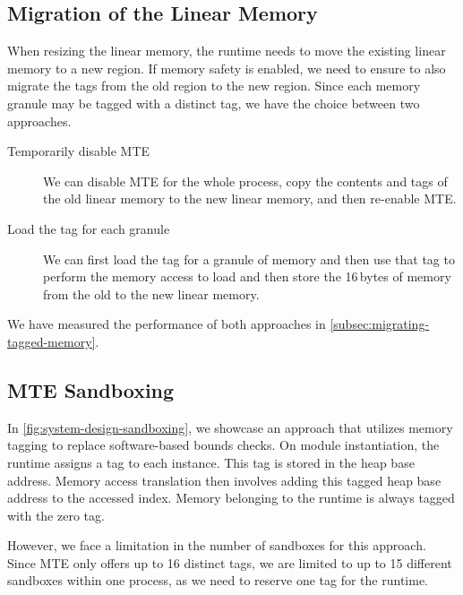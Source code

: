 \subsection{Migration of the Linear Memory}
\label{subsec:migration-of-the-linear-memory}

When resizing the linear memory, the runtime needs to move the existing linear memory to a new region.
If memory safety is enabled, we need to ensure to also migrate the tags from the old region to the new region.
Since each memory granule may be tagged with a distinct tag, we have the choice between two approaches.

\begin{description}
\item[Temporarily disable MTE]
We can disable \ac{MTE} for the whole process, copy the contents and tags of the old linear memory to the new linear memory, and then re-enable \ac{MTE}.

\item[Load the tag for each granule]
We can first load the tag for a granule of memory and then use that tag to perform the memory access to load and then store the 16\,bytes of memory from the old to the new linear memory.
\end{description}

\noindent
We have measured the performance of both approaches in \cref{subsec:migrating-tagged-memory}.

\subsection{\ac{MTE} Sandboxing}
\label{subsec:bounds-checks}

In \cref{fig:system-design-sandboxing}, we showcase an approach that utilizes memory tagging to replace software-based bounds checks.
On module instantiation, the runtime assigns a tag to each instance.
This tag is stored in the heap base address.
Memory access translation then involves adding this tagged heap base address to the accessed index.
Memory belonging to the runtime is always tagged with the zero tag.

However, we face a limitation in the number of sandboxes for this approach.
Since \ac{MTE} only offers up to 16 distinct tags, we are limited to up to 15 different sandboxes within one process, as we need to reserve one tag for the runtime.

